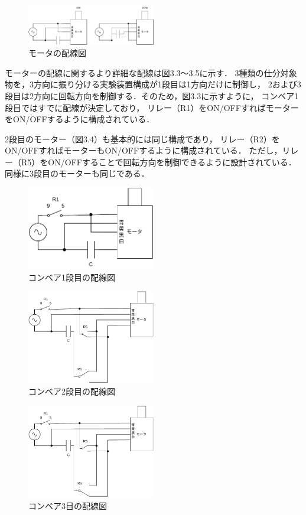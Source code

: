 \begin{figure}[h]
  \centering
  \includegraphics[width=0.5\textwidth]{sozai/7.pdf}
  \caption{モータの配線図}
\end{figure}

モーターの配線に関するより詳細な配線は図3.3～3.5に示す．
3種類の仕分対象物を，3方向に振り分ける実験装置構成が1段目は1方向だけに制御し，
2および3段目は2方向に回転方向を制御する．そのため，図3.3に示すように，
コンベア1段目ではすでに配線が決定しており，
リレー（R1）をON/OFFすればモーターをON/OFFするように構成されている．

2段目のモーター（図3.4）も基本的には同じ構成であり，
リレー（R2）をON/OFFすればモーターもON/OFFするように構成されている．
ただし，リレー（R5）をON/OFFすることで回転方向を制御できるように設計されている．
同様に3段目のモーターも同じである．

\begin{figure}[H]
  \centering
  \includegraphics[width=0.5\textwidth]{sozai/8.pdf}
  \caption{コンベア1段目の配線図}
\end{figure}

\begin{figure}[H]
  \centering
  \includegraphics[width=0.5\textwidth]{sozai/9.pdf}
  \caption{コンベア2段目の配線図}
\end{figure}

\begin{figure}[H]
  \centering
  \includegraphics[width=0.5\textwidth]{sozai/10.pdf}
  \caption{コンベア3目の配線図}
\end{figure}

